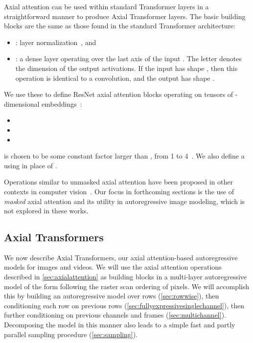 \documentclass{article} \usepackage{iclr2020_conference,times}
\begin{document}
Axial attention can be used within standard Transformer layers in a straightforward manner to produce Axial Transformer layers. The basic building blocks are the same as those found in the standard Transformer architecture:

\begin{itemize}
    \item : layer normalization~\citep{ba2016layer}, and
    \item : a dense layer operating over the last axis of the input . The letter  denotes the dimension of the output activations. If the input has shape , then this operation is identical to a  convolution, and the output has shape .
\end{itemize}

We use these to define ResNet axial attention blocks operating on tensors of -dimensional embeddings~\citep{vaswani2017attention,child2019generating}:

\begin{itemize}
\item 
\item 
\item 
\end{itemize}

 is chosen to be some constant factor larger than , from 1 to 4~\citep{vaswani2017attention}. We also define a  using  in place of .

Operations similar to unmasked axial attention have been proposed in other contexts in computer vision~\citep{huang2019ccnet}. Our focus in forthcoming sections is the use of \emph{masked} axial attention and its utility in autoregressive image modeling, which is not explored in these works.


\FloatBarrier

\subsection{Axial Transformers}

\label{sec:model}

We now describe Axial Transformers, our axial attention-based autoregressive models for images and videos. We will use the axial attention operations described in \cref{sec:axialattention} as building blocks in a multi-layer autoregressive model of the form  following the raster scan ordering of pixels. We will accomplish this by building an autoregressive model over rows (\cref{sec:rowwise}), then conditioning each row on previous rows (\cref{sec:fullyexpressivesinglechannel}), then further conditioning on previous channels and frames (\cref{sec:multichannel}). Decomposing the model in this manner also leads to a simple fast and partly parallel sampling procedure (\cref{sec:sampling}).
\end{document}
